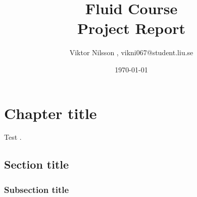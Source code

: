 \documentclass[]{report}   %
\begin{document}
\title{Fluid Course\\ Project Report}   %
\author{Viktor Nilsson , vikni067@student.liu.se}

\date{\today}    %
\maketitle

\setcounter{page}{2}

\begin{abstract}
	\lipsum[1]
	
\end{abstract}

\chapter{Chapter title}
	Test \cite{Bee12}.
	
	\section{Section title}
		\lipsum[1]
	
	\subsection{Subsection title}
		\lipsum[1]




\end{document}
